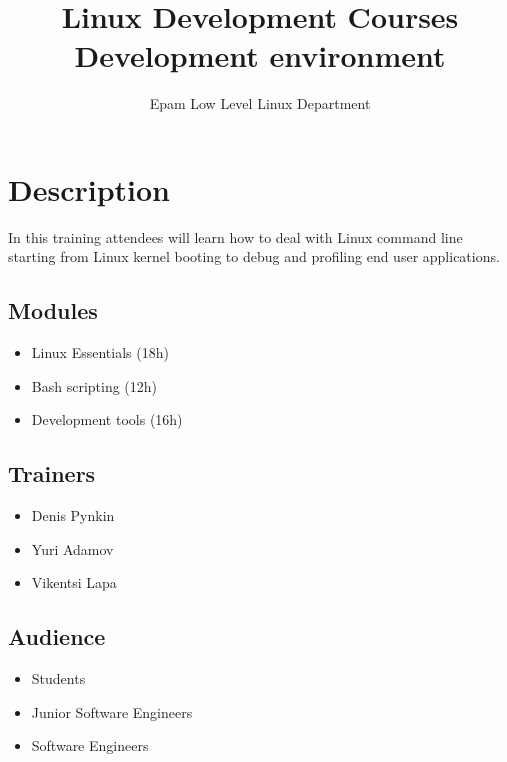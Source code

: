 \documentclass[12pt,a4paper,oneside]{article}
\begin{document}
\title{Linux Development Courses\\Development environment}
\author{Epam Low Level Linux Department}
\maketitle





\section{Description}

In this training attendees will learn how to deal with Linux command line
starting from Linux kernel booting to debug and profiling end user applications.

\subsection{Modules}
\begin{itemize}
	\item Linux Essentials (18h)
	\item Bash scripting (12h)
	\item Development tools (16h)
\end{itemize}

\subsection{Trainers}
\begin{itemize}
	\item Denis Pynkin
	\item Yuri Adamov
	\item Vikentsi Lapa
\end{itemize}

\subsection{Audience}
\begin{itemize}
	\item Students
	\item Junior Software Engineers
	\item Software Engineers
\end{itemize}
\end{document}
